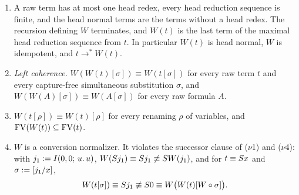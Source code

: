 \begin{lemma}
\label{comp:lem:whnf}
\begin{enumerate}[label=(\alph*)]
\item A raw term has at most one head redex, every head reduction sequence
 is finite, and the head normal terms are the terms without a head redex.
 The recursion defining $W$ terminates, and $W(t)$ is the last term of the
 maximal head reduction sequence from $t$. In particular $W(t)$ is head
 normal, $W$ is idempotent, and $t\to^{*}W(t)$.
\item \emph{Left coherence.} $W(W(t)[\sigma])\equiv W(t[\sigma])$ for every
 raw term $t$ and every capture-free simultaneous substitution $\sigma$, and
 $W(W(A)[\sigma])\equiv W(A[\sigma])$ for every raw formula $A$.
\item $W(t[\rho])\equiv W(t)[\rho]$ for every renaming $\rho$ of variables,
 and $\operatorname{FV}(W(t))\subseteq\operatorname{FV}(t)$.
\item $W$ is a conversion normalizer. It violates the successor clause of
 ($\nu$1) and ($\nu$4): with $j_1\mathrel{:=}I(0,0;\,u.\,u)$,
 $W(S j_1)\equiv S j_1\not\equiv S W(j_1)$, and for $t\equiv S x$
 and $\sigma\mathrel{:=}[j_1/x]$,
 \[
  W(t[\sigma])\equiv S j_1\not\equiv S0\equiv
  W\bigl(W(t)[W\circ\sigma]\bigr).
 \]
\end{enumerate}
\end{lemma}

